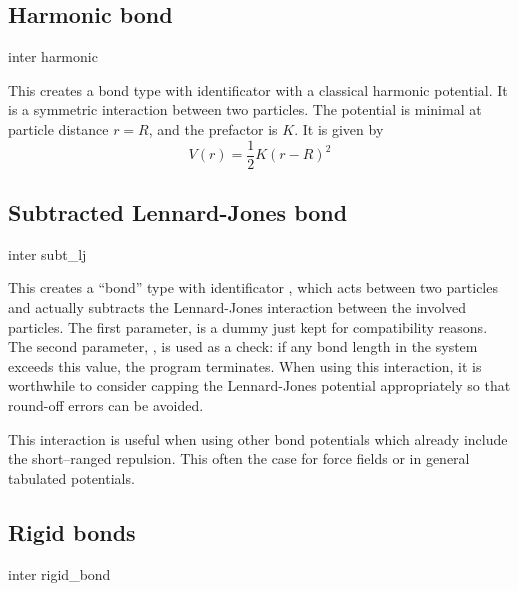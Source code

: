 \subsection{Harmonic bond}

\begin{essyntax}
  inter 
  harmonic  
\end{essyntax}
This creates a bond type with identificator  with a
classical harmonic potential. It is a symmetric interaction between two
particles. The potential is minimal at particle distance $r=R$, and the
prefactor is $K$. It is given by
\begin{equation}
  V(r) = \frac{1}{2} K \left( r - R \right)^2
\end{equation}

\subsection{Subtracted Lennard-Jones bond}

\begin{essyntax}
  inter 
  subt_lj
   
\end{essyntax}
This creates a ``bond'' type with identificator , which
acts between two particles and actually subtracts the Lennard-Jones interaction
between the involved particles.  The first parameter,  is a dummy
just kept for compatibility reasons. The second parameter, , is used as a
check: if any bond length in the system exceeds this value, the program
terminates. When using this interaction, it is worthwhile to consider
capping the Lennard-Jones potential appropriately so that round-off errors can
be avoided.

This interaction is useful when using other bond potentials which already
include the short--ranged repulsion. This often the case for force fields or in
general tabulated potentials.

\subsection{Rigid bonds}

\begin{essyntax}
  inter 
  rigid_bond
    
\end{essyntax}

